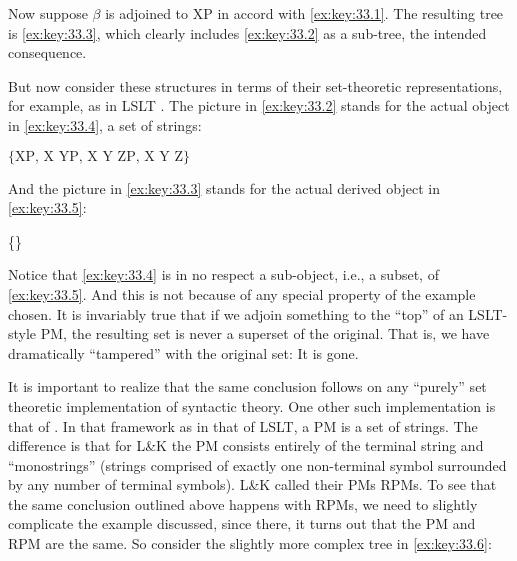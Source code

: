 \documentclass[output=paper]{langsci/langscibook}
\begin{document}
\ea\label{ex:key:33.2}
\z

Now suppose $\beta$ is adjoined to XP in accord with
\eqref{ex:key:33.1}. The resulting tree is \eqref{ex:key:33.3}, which clearly
includes \eqref{ex:key:33.2} as a sub-tree, the intended consequence.

\ea\label{ex:key:33.3}
\z

But now consider these structures in terms of their set-theoretic
representations, for example, as in LSLT \parencite{Chomsky1955}. The picture
in \eqref{ex:key:33.2} stands for the actual object in \eqref{ex:key:33.4}, a
set of strings:

\ea\label{ex:key:33.4}$\{\text{XP, X YP, X Y ZP, X Y Z}\}$
\z

And the picture in \eqref{ex:key:33.3} stands for the actual derived object in
\eqref{ex:key:33.5}:

\ea\label{ex:key:33.5}\{\}
\z

Notice that \eqref{ex:key:33.4} is in no respect a sub-object, i.e., a subset, of \eqref{ex:key:33.5}. And this
is not because of any special property of the example chosen. It is invariably
true that if we adjoin something to the \enquote{top} of an
LSLT\nocite{Chomsky1955}-style \gls{PM}, the resulting set is never a superset
of the original. That is, we have dramatically \enquote{tampered} with the original
set: It is gone.

It is important to realize that the same conclusion follows on any \enquote{purely} set
theoretic implementation of syntactic theory. One other such implementation is
that of \cite{lk}. In that framework as in that of LSLT\nocite{Chomsky1955}, a
\gls{PM} is a set of strings. The difference is that for L\&K the \gls{PM} consists
entirely of the terminal string and \enquote{monostrings} (strings comprised of exactly
one non-terminal symbol surrounded by any number of terminal symbols). L\&K
called their \glspl{PM} \glspl{RPM}. To see that the same conclusion outlined
above happens with \glspl{RPM}, we need to slightly complicate the example
discussed, since there, it turns out that the \gls{PM} and \gls{RPM} are the
same. So consider the slightly more complex tree in \eqref{ex:key:33.6}:
\end{document}
